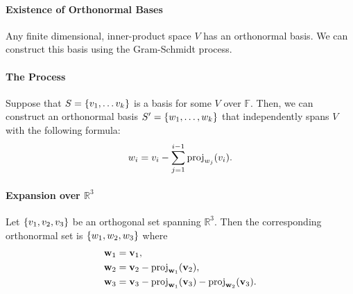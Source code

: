 \paragraph{Existence of Orthonormal Bases}
Any finite dimensional, inner-product space \( V \) has an orthonormal basis.
We can construct this basis using the Gram-Schmidt process.

\paragraph{The Process}
Suppose that \( S = \left\{ v_1, \dots v_k \right\} \) is a basis for some \( V \)
over \( \mathbb{F} \).
Then, we can construct an orthonormal basis \( S' = \left\{ w_1, \dots, w_k \right\} \)
that independently spans \( V \) with the following formula: \[
    w_{i} = v_{i} - \sum_{j = 1}^{i - 1} \mathrm{proj}_{w_j}(v_i).
\]

\paragraph{Expansion over \( \mathbb{R}^3 \)}
Let \( \left\{ v_1, v_2, v_3 \right\} \) be an orthogonal set spanning \( \mathbb{R}^3 \).
Then the corresponding orthonormal set is \( \left\{ w_1, w_2, w_3 \right\} \) where
\begin{align*}
    \mathbf{w}_1     &= \mathbf{v}_1, \\
    \mathbf{w}_2     &= \mathbf{v}_2 - \mathrm{proj}_{\mathbf{w}_1}(\mathbf{v}_2), \\
    \mathbf{w}_3     &= \mathbf{v}_3 - \mathrm{proj}_{\mathbf{w}_1}(\mathbf{v}_3) - \mathrm{proj}_{\mathbf{w}_2}(\mathbf{v}_3).
\end{align*}
